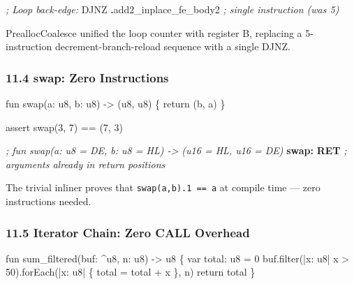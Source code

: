 \documentclass[
  11pt,
]{article}
\newenvironment{Shaded}{\begin{snugshade}}{\end{snugshade}}
\newcommand{\CommentTok}[1]{\textcolor[rgb]{0.56,0.35,0.01}{\textit{#1}}}
\newcommand{\ControlFlowTok}[1]{\textcolor[rgb]{0.13,0.29,0.53}{\textbf{#1}}}
\newcommand{\FunctionTok}[1]{\textcolor[rgb]{0.13,0.29,0.53}{\textbf{#1}}}
\newcommand{\NormalTok}[1]{#1}
\newcommand{\OperatorTok}[1]{\textcolor[rgb]{0.81,0.36,0.00}{\textbf{#1}}}
\begin{document}
\begin{Shaded}
\begin{Highlighting}[]
\CommentTok{; Loop back{-}edge:}
\NormalTok{    DJNZ }\OperatorTok{.}\NormalTok{add2\_inplace\_fe\_body2    }\CommentTok{; single instruction (was 5)}
\end{Highlighting}
\end{Shaded}

PreallocCoalesce unified the loop counter with register B, replacing a
5-instruction decrement-branch-reload sequence with a single DJNZ.

\hypertarget{swap-zero-instructions}{%
\subsubsection{11.4 swap: Zero
Instructions}\label{swap-zero-instructions}}

\begin{Shaded}
\begin{Highlighting}[]
\NormalTok{fun swap(a: u8, b: u8) {-}\textgreater{} (u8, u8) \{ return (b, a) \}}

\NormalTok{assert swap(3, 7) == (7, 3)}
\end{Highlighting}
\end{Shaded}

\begin{Shaded}
\begin{Highlighting}[]
\CommentTok{; fun swap(a: u8 = DE, b: u8 = HL) {-}\textgreater{} (u16 = HL, u16 = DE)}
\FunctionTok{swap:}
    \ControlFlowTok{RET}         \CommentTok{; arguments already in return positions}
\end{Highlighting}
\end{Shaded}

The trivial inliner proves that \texttt{swap(a,b).1\ ==\ a} at compile
time --- zero instructions needed.

\hypertarget{iterator-chain-zero-call-overhead}{%
\subsubsection{11.5 Iterator Chain: Zero CALL
Overhead}\label{iterator-chain-zero-call-overhead}}

\begin{Shaded}
\begin{Highlighting}[]
\NormalTok{fun sum\_filtered(buf: \^{}u8, n: u8) {-}\textgreater{} u8 \{}
\NormalTok{    var total: u8 = 0}
\NormalTok{    buf.filter(|x: u8| x \textgreater{} 50).forEach(|x: u8| \{ total = total + x \}, n)}
\NormalTok{    return total}
\NormalTok{\}}
\end{Highlighting}
\end{Shaded}
\end{document}
